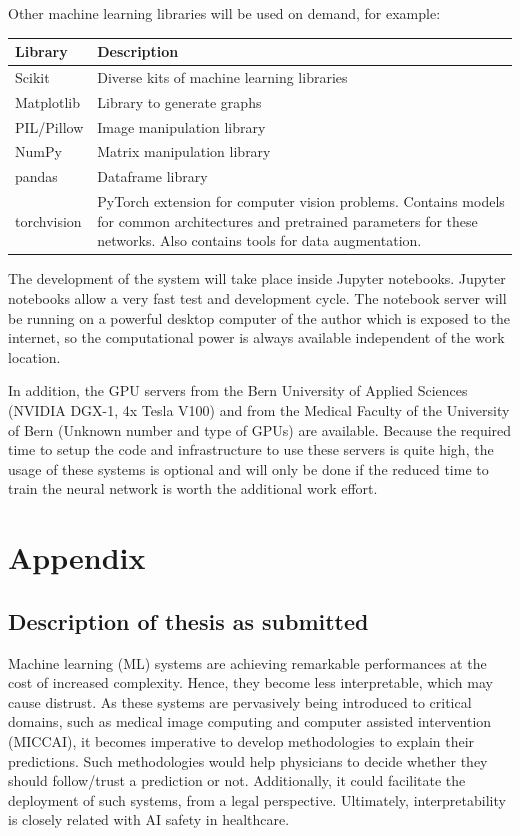 Other machine learning libraries will be used on demand, for example:

\begin{tabular}{|p{3cm}|p{12.5cm}|}
    \hline
    \textbf{Library} & \textbf{Description} \\ \hline
    Scikit & Diverse kits of machine learning libraries \\ \hline
    Matplotlib & Library to generate graphs \\ \hline
    PIL/Pillow & Image manipulation library \\ \hline
    NumPy & Matrix manipulation library \\ \hline
    pandas & Dataframe library \\ \hline
    torchvision & PyTorch extension for computer vision problems. Contains models for common architectures and pretrained parameters for these networks. Also contains tools for data augmentation. \\ \hline
\end{tabular}

The development of the system will take place inside Jupyter notebooks. Jupyter notebooks allow a very fast test and development cycle. The notebook server will be running on a powerful desktop computer of the author which is exposed to the internet, so the computational power is always available independent of the work location.

In addition, the GPU servers from the Bern University of Applied Sciences (NVIDIA DGX-1, 4x Tesla V100) and from the Medical Faculty of the University of Bern (Unknown number and type of GPUs) are available. Because the required time to setup the code and infrastructure to use these servers is quite high, the usage of these systems is optional and will only be done if the reduced time to train the neural network is worth the additional work effort.


\section{Appendix}
\subsection{Description of thesis as submitted}

Machine learning (ML) systems are achieving remarkable performances at the cost of increased complexity. Hence, they become less interpretable, which may cause distrust. As these systems are pervasively being introduced to critical domains, such as medical image computing and computer assisted intervention (MICCAI), it becomes imperative to develop methodologies to explain their predictions. Such methodologies would help physicians to decide whether they should follow/trust a prediction or not. Additionally, it could facilitate the deployment of such systems, from a legal perspective. Ultimately, interpretability is closely related with AI safety in healthcare.

